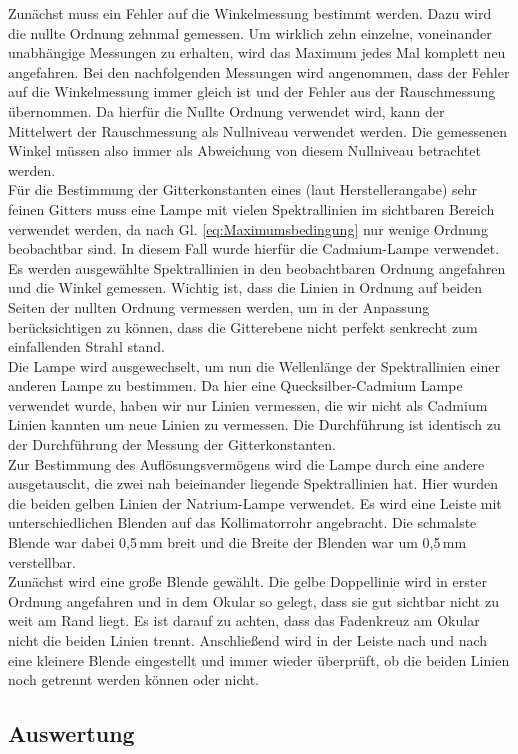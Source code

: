 \documentclass[12pt,a4paper]{article}
\begin{document}
	Zunächst muss ein Fehler auf die Winkelmessung bestimmt werden. Dazu wird die nullte Ordnung zehnmal gemessen. Um wirklich zehn einzelne, voneinander unabhängige Messungen zu erhalten, wird das Maximum jedes Mal komplett neu angefahren. Bei den nachfolgenden Messungen wird angenommen, dass der Fehler auf die Winkelmessung immer gleich ist und der Fehler aus der Rauschmessung übernommen. Da hierfür die Nullte Ordnung verwendet wird, kann der Mittelwert der Rauschmessung als Nullniveau verwendet werden. Die gemessenen Winkel müssen also immer als Abweichung von diesem Nullniveau betrachtet werden.\\
	Für die Bestimmung der Gitterkonstanten eines (laut Herstellerangabe) sehr feinen Gitters muss eine Lampe mit vielen Spektrallinien im sichtbaren Bereich verwendet werden, da nach Gl. \ref{eq:Maximumsbedingung} nur wenige Ordnung beobachtbar sind. In diesem Fall wurde hierfür die Cadmium-Lampe verwendet. Es werden ausgewählte Spektrallinien in den beobachtbaren Ordnung angefahren und die Winkel gemessen. Wichtig ist, dass die Linien in Ordnung auf beiden Seiten der nullten Ordnung vermessen werden, um in der Anpassung berücksichtigen zu können, dass die Gitterebene nicht perfekt senkrecht zum einfallenden Strahl stand.\\
	Die Lampe wird ausgewechselt, um nun die Wellenlänge der Spektrallinien einer anderen Lampe zu bestimmen. Da hier eine Quecksilber-Cadmium Lampe verwendet wurde, haben wir nur Linien vermessen, die wir nicht als Cadmium Linien kannten um neue Linien zu vermessen. Die Durchführung ist identisch zu der Durchführung der Messung der Gitterkonstanten.\\
	Zur Bestimmung des Auflösungsvermögens wird die Lampe durch eine andere ausgetauscht, die zwei nah beieinander liegende Spektrallinien hat. Hier wurden die beiden gelben Linien der Natrium-Lampe verwendet. Es wird eine Leiste mit unterschiedlichen Blenden auf das Kollimatorrohr angebracht. Die schmalste Blende war dabei 0,5\,mm breit und die Breite der Blenden war um 0,5\,mm verstellbar.\\
	Zunächst wird eine große Blende gewählt. Die gelbe Doppellinie wird in erster Ordnung angefahren und in dem Okular so gelegt, dass sie gut sichtbar nicht zu weit am Rand liegt. Es ist darauf zu achten, dass das Fadenkreuz am Okular nicht die beiden Linien trennt. Anschließend wird in der Leiste nach und nach eine kleinere Blende eingestellt und immer wieder überprüft, ob die beiden Linien noch getrennt werden können oder nicht.
	\subsection{Auswertung}
\end{document}
